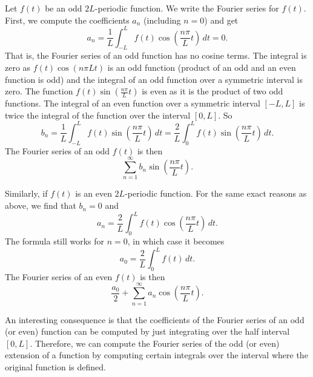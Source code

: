 Let $f(t)$ be an odd $2L$-periodic function.  We write 
the Fourier series for $f(t)$.  First, we compute the coefficients $a_n$ (including
$n=0$) and get
\begin{equation*}
a_n = \frac{1}{L} \int_{-L}^L f(t) \cos \left( \frac{n \pi}{L} t \right)
\, dt = 0 .
\end{equation*}
That is, the Fourier series of an odd function has no cosine terms.
The integral is zero
as $f(t) \cos \left( {n \pi}{L} t \right)$
is an odd function (product of an odd and an
even function is odd) and the integral of an odd function over a symmetric
interval is zero.
The function $f(t) \sin \left( \frac{n \pi}{L} t \right)$ is even
as it is the product of two odd
functions.
The integral of an even function over a symmetric interval
$[-L,L]$ is twice the integral of the function over the interval $[0,L]$.
So
\begin{equation*}
b_n = 
\frac{1}{L} \int_{-L}^L f(t) \sin \left( \frac{n \pi}{L} t \right) \, dt =
\frac{2}{L} \int_{0}^L f(t) \sin \left( \frac{n \pi}{L} t \right) \, dt .
\end{equation*}
The Fourier series of an odd $f(t)$ is then
\begin{equation*}
\sum_{n=1}^\infty b_n \sin \left( \frac{n \pi}{L} t \right) .
\end{equation*}

Similarly, if $f(t)$ is an even $2L$-periodic function.  For the same exact
reasons as above, we find that $b_n = 0$ and
\begin{equation*}
a_n = 
\frac{2}{L} \int_{0}^L f(t) \cos \left( \frac{n \pi}{L} t \right) \, dt .
\end{equation*}
The formula still works for $n=0$, in which case it becomes
\begin{equation*}
a_0 = 
\frac{2}{L} \int_{0}^L f(t) \, dt .
\end{equation*}
The Fourier series of an even $f(t)$ is then
\begin{equation*}
\frac{a_0}{2}
+
\sum_{n=1}^\infty a_n \cos \left( \frac{n \pi}{L} t \right) .
\end{equation*}

An interesting consequence is that the coefficients of the Fourier series of
an odd (or even) function can be computed by just integrating over the half
interval $[0,L]$.  Therefore, we can compute the Fourier series of
the odd (or even) extension of a
function by computing certain integrals over the interval
where the original function is defined.

